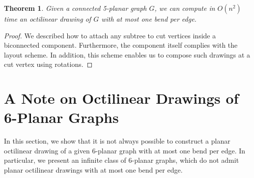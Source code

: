 \documentclass[a4paper,twoside,11pt]{article}
\newtheorem{theorem}{Theorem}
\begin{document}
\begin{theorem}
Given a connected 5-planar graph $G$, we can compute in $O(n^2)$
time an octilinear drawing of $G$ with at most one bend per edge.
\label{thm:5planarconnected}
\end{theorem}
\begin{proof}
We described how to attach any subtree to cut vertices inside a
biconnected component. Furthermore, the component itself complies
with the layout scheme. In addition, this scheme enables us to
compose such drawings at a cut vertex using rotations.
\end{proof}

\section{A Note on Octilinear Drawings of 6-Planar Graphs}
\label{sec:6planar}
In this section, we show that it is not always possible to construct
a planar octilinear drawing of a given $6$-planar graph with at most
one bend per edge. In particular, we present an infinite class of
6-planar graphs, which do not admit planar octilinear drawings with
at most one bend per edge.
\end{document}

